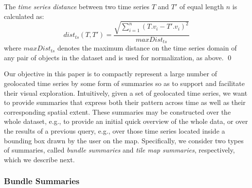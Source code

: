 \begin{mydefinition} The {\em time series distance} between two time series $T$ and $T'$ of equal length $n$ is calculated as:
\begin{equation} \label{eq:dist_ts}
dist_{ts}(T, T') = \frac{\sqrt{\displaystyle \sum_{i=1}^{n}(T.v_i - T'.v_i)^2}}{maxDist_{ts}}
\end{equation}
\noindent where $maxDist_{ts}$ denotes the maximum distance on the time series domain of any pair of objects in the dataset and is used for normalization, as above. \qed
\end{mydefinition}



Our objective in this paper is to compactly represent a large number of geolocated time series by some form of summaries so as to support and facilitate their visual exploration. Intuitively, given a set of geolocated time series, we want to provide summaries that express both their pattern across time as well as their corresponding spatial extent. These summaries may be constructed over the whole dataset, e.g., to provide an initial quick overview of the whole data, or over the results of a previous query, e.g., over those time series located inside a bounding box drawn by the user on the map. Specifically, we consider two types of summaries, called \emph{bundle summaries} and \emph{tile map summaries}, respectively, which we describe next.



\subsubsection{Bundle Summaries}
\label{subsec:bundle_sums}


%

